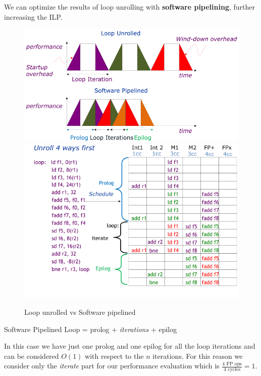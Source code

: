 We can optimize the results of loop unrolling with \textbf{software pipelining}, further increasing the ILP\@.
\begin{figure}[h]
    \centering
    \includegraphics[scale = 0.4]{images/loop-unrolled-vs-software-pipelined-1}
    \includegraphics[scale = 0.4]{images/loop-unrolled-vs-software-pipelined-2}
    \caption{Loop unrolled vs Software pipelined}
    \label{fig:loop-unrolled-vs-sw-pipelined}
\end{figure}

\begin{center}
    Software Pipelined Loop = prolog + \textit{iterations} + epilog
\end{center}

In this case we have just one prolog and one epilog for all the loop iterations and can be considered $O(1)$ with
respect to the $n$ iterations.
For this reason we consider only the \textit{iterate} part for our performance evaluation which is \(\frac{4\text{ FP
ops}}{4\text{ cycles}} = 1\).

